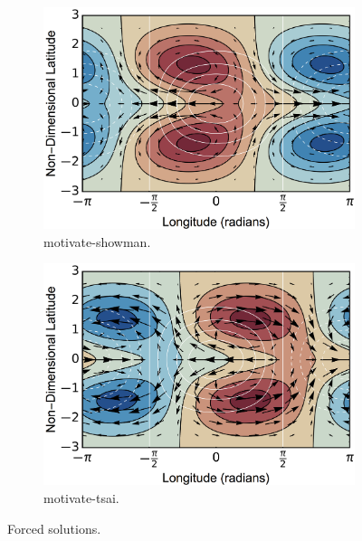 \begin{figure}
  \centering
  \begin{subfigure}[b]{0.49\textwidth}
    \includegraphics[width=1.0\textwidth]{figures/wave-mean-flow/motivate-showman.png}
    \caption{motivate-showman.}
    \label{fig:motivate-showman}
  \end{subfigure}
  \begin{subfigure}[b]{0.49\textwidth}
    \includegraphics[width=1.0\textwidth]{figures/wave-mean-flow/motivate-tsai.png}
    \caption{motivate-tsai.}
    \label{fig:motivate-tsai}
  \end{subfigure}
  \caption{Forced solutions.}
  \label{fig:motivate-showman-tsai}
\end{figure}


